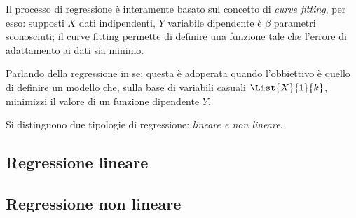 \documentclass{subfiles}
\begin{document}
Il processo di regressione è interamente basato sul concetto di \emph{curve fitting}, per esso:
supposti \(X\) dati indipendenti, \(Y\) variabile dipendente è \(\beta\) parametri sconosciuti;
il curve fitting permette di definire una funzione tale che l'errore di adattamento ai dati sia minimo.

Parlando della regressione in se: questa è adoperata quando l'obbiettivo è quello di definire un modello che,
sulla base di variabili casuali \(\List{X}{1}{k}\), minimizzi il valore di un funzione dipendente \(Y\).

Si distinguono due tipologie di regressione: \emph{lineare \emph{e} non lineare}.

\subsection{Regressione lineare}


\subsection{Regressione non lineare}

\end{document}
